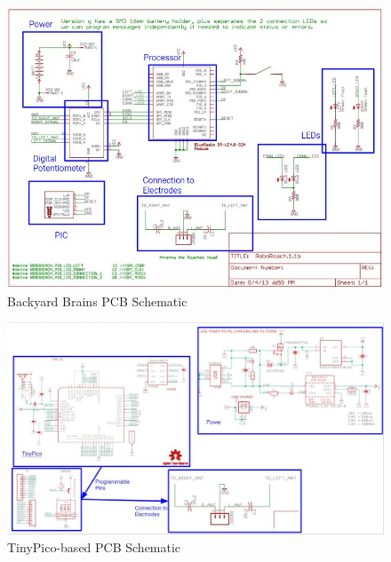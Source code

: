 \documentclass{article}
\begin{document}
\begin{figure}[ht!]
\centering
\includegraphics[scale=0.60]{BBschematic.JPG}
\caption{Backyard Brains PCB Schematic}
\label{fig:bbs}
\end{figure}

\begin{figure}[ht!]
\centering
\includegraphics[scale=0.4]{TPschematic.JPG}
\caption{TinyPico-based PCB Schematic}
\label{fig:tps}
\end{figure}
\end{document}
